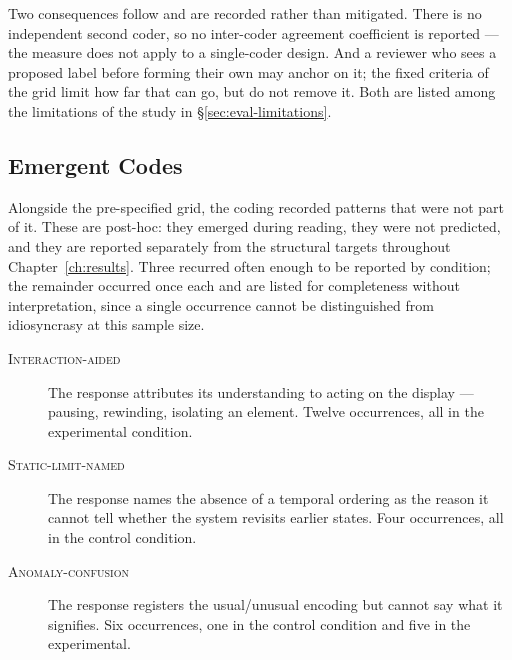 Two consequences follow and are recorded rather than mitigated. There is no independent
second coder, so no inter-coder agreement coefficient is reported --- the measure does not
apply to a single-coder design. And a reviewer who sees a proposed label before forming their
own may anchor on it; the fixed criteria of the grid limit how far that can go, but do not
remove it. Both are listed among the limitations of the study in \S\ref{sec:eval-limitations}.

\subsection{Emergent Codes}
\label{subsec:app-emergent}

Alongside the pre-specified grid, the coding recorded patterns that were not part of it.
These are post-hoc: they emerged during reading, they were not predicted, and they are
reported separately from the structural targets throughout Chapter~\ref{ch:results}. Three
recurred often enough to be reported by condition; the remainder occurred once each and are
listed for completeness without interpretation, since a single occurrence cannot be
distinguished from idiosyncrasy at this sample size.

\begin{description}
\item[\textnormal{\textsc{Interaction-aided}}] The response attributes its understanding to
acting on the display --- pausing, rewinding, isolating an element. Twelve occurrences, all
in the experimental condition.

\item[\textnormal{\textsc{Static-limit-named}}] The response names the absence of a temporal
ordering as the reason it cannot tell whether the system revisits earlier states. Four
occurrences, all in the control condition.

\item[\textnormal{\textsc{Anomaly-confusion}}] The response registers the usual/unusual
encoding but cannot say what it signifies. Six occurrences, one in the control condition and
five in the experimental.
\end{description}

